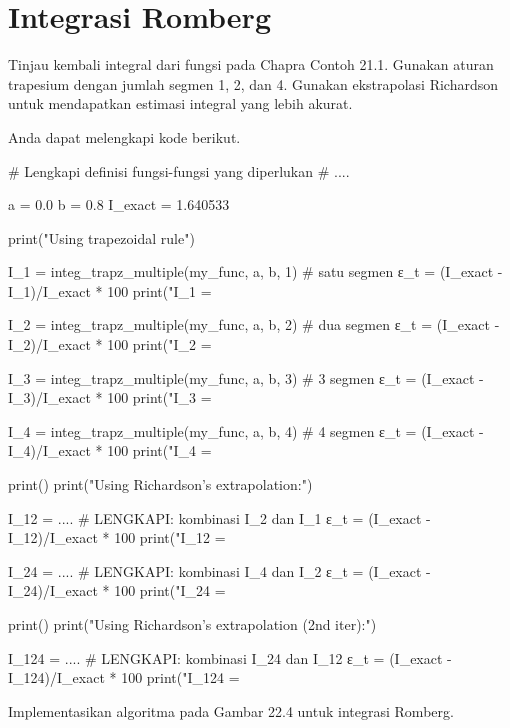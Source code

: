 \section{Integrasi Romberg}

\begin{soal}
Tinjau kembali integral dari fungsi pada Chapra Contoh 21.1. Gunakan aturan trapesium
dengan jumlah segmen 1, 2, dan 4. Gunakan ekstrapolasi Richardson untuk
mendapatkan estimasi integral yang lebih akurat.
\end{soal}

Anda dapat melengkapi kode berikut.
\begin{pythoncode}
# Lengkapi definisi fungsi-fungsi yang diperlukan
# ....

a = 0.0
b = 0.8
I_exact = 1.640533

print("Using trapezoidal rule")

I_1 = integ_trapz_multiple(my_func, a, b, 1) # satu segmen
ε_t = (I_exact - I_1)/I_exact * 100
print("I_1  = %

I_2 = integ_trapz_multiple(my_func, a, b, 2) # dua segmen
ε_t = (I_exact - I_2)/I_exact * 100
print("I_2  = %

I_3 = integ_trapz_multiple(my_func, a, b, 3) # 3 segmen
ε_t = (I_exact - I_3)/I_exact * 100
print("I_3  = %

I_4 = integ_trapz_multiple(my_func, a, b, 4) # 4 segmen
ε_t = (I_exact - I_4)/I_exact * 100
print("I_4  = %

print()
print("Using Richardson's extrapolation:")

I_12 = .... # LENGKAPI: kombinasi I_2 dan I_1
ε_t = (I_exact - I_12)/I_exact * 100
print("I_12 = %

I_24 = .... # LENGKAPI: kombinasi I_4 dan I_2
ε_t = (I_exact - I_24)/I_exact * 100
print("I_24 = %

print()
print("Using Richardson's extrapolation (2nd iter):")

I_124 = .... # LENGKAPI: kombinasi I_24 dan I_12
ε_t = (I_exact - I_124)/I_exact * 100
print("I_124 = %
\end{pythoncode}

\begin{soal}
Implementasikan algoritma pada Gambar 22.4 untuk integrasi Romberg.
\end{soal}

